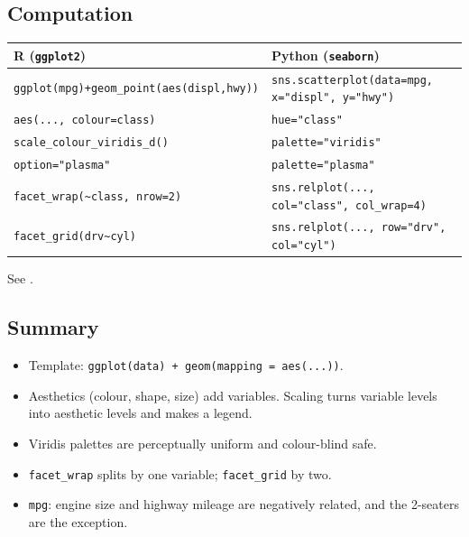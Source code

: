 \subsection{Computation}
\begin{center}
\small\begin{tabular}{@{}>{\raggedright\arraybackslash}p{7.3cm}>{\raggedright\arraybackslash}p{8.3cm}@{}}\hline
R (\texttt{ggplot2}) & Python (\texttt{seaborn})\\\hline
\texttt{ggplot(mpg)+geom\_point(aes(displ,hwy))} & \texttt{sns.scatterplot(data=mpg, x="displ", y="hwy")}\\
\texttt{aes(..., colour=class)} & \texttt{hue="class"}\\
\texttt{scale\_colour\_viridis\_d()} & \texttt{palette="viridis"}\\
\texttt{option="plasma"} & \texttt{palette="plasma"}\\
\texttt{facet\_wrap(\textasciitilde class, nrow=2)} & \texttt{sns.relplot(..., col="class", col\_wrap=4)}\\
\texttt{facet\_grid(drv\textasciitilde cyl)} & \texttt{sns.relplot(..., row="drv", col="cyl")}\\\hline
\end{tabular}
\end{center}
See .

\subsection{Summary}
\begin{itemize}
  \item Template: \texttt{ggplot(data) + geom(mapping = aes(...))}.
  \item Aesthetics (colour, shape, size) add variables. Scaling turns variable levels into aesthetic levels and makes a legend.
  \item Viridis palettes are perceptually uniform and colour-blind safe.
  \item \texttt{facet\_wrap} splits by one variable; \texttt{facet\_grid} by two.
  \item \texttt{mpg}: engine size and highway mileage are negatively related, and the 2-seaters are the exception.
\end{itemize}

